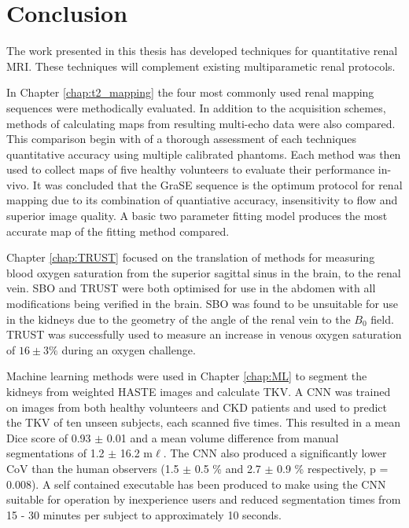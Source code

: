 \chapter{Conclusion}
\label{chap:conclusion}
\newpage
The work presented in this thesis has developed techniques for quantitative renal \ac{MRI}. These techniques will complement existing multiparametic renal protocols.

In Chapter \ref{chap:t2_mapping} the four most commonly used renal \ttwo mapping sequences were methodically evaluated. In addition to the acquisition schemes, methods of calculating \ttwo maps from resulting multi-echo data were also compared. This comparison begin with of a thorough assessment of each techniques quantitative accuracy using multiple calibrated phantoms. Each method was then used to collect \ttwo maps of five healthy volunteers to evaluate their performance in-vivo. It was concluded that the \ac{GraSE} sequence is the optimum protocol for renal \ttwo mapping due to its combination of quantiative accuracy, insensitivity to flow and superior image quality. A basic two parameter fitting model produces the most accurate \ttwo map of the fitting method compared.

Chapter \ref{chap:TRUST} focused on the translation of methods for measuring blood oxygen saturation from the superior sagittal sinus in the brain, to the renal vein. \ac{SBO} and \ac{TRUST} were both optimised for use in the abdomen with all modifications being verified in the brain. \ac{SBO} was found to be unsuitable for use in the kidneys due to the geometry of the angle of the renal vein to the $B_0$ field. \ac{TRUST} was successfully used to measure an increase in venous oxygen saturation of $16 \pm 3 \%$ during an oxygen challenge.

Machine learning methods were used in Chapter \ref{chap:ML} to segment the kidneys from \ttwo weighted \ac{HASTE} images and calculate \ac{TKV}. A \ac{CNN} was trained on images from both healthy volunteers and \ac{CKD} patients and used to predict the \ac{TKV} of ten unseen subjects, each scanned five times. This resulted in a mean Dice score of 0.93 $\pm$ 0.01 and a mean volume difference from manual segmentations of 1.2 $\pm$ 16.2 m$\ell$. The \ac{CNN} also produced a significantly lower \ac{CoV} than the human observers (1.5 $\pm$ 0.5 \% and 2.7 $\pm$ 0.9 \% respectively, p = 0.008). A self contained executable has been produced to make using the \ac{CNN} suitable for operation by inexperience users and reduced segmentation times from 15 - 30 minutes per subject to approximately 10 seconds.

